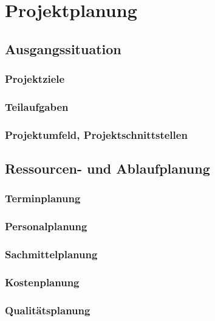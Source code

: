 \chapter{Projektplanung}
\label{cha:Projektmanagement}

\section{Ausgangssituation}
	\subsection{Projektziele}
	
	\subsection{Teilaufgaben}
	
	\subsection{Projektumfeld, Projektschnittstellen}
	
\section{Ressourcen- und Ablaufplanung}
	\subsection{Terminplanung}
	
	\subsection{Personalplanung}
	
	\subsection{Sachmittelplanung}
	
	\subsection{Kostenplanung}
	
	\subsection{Qualitätsplanung}
	